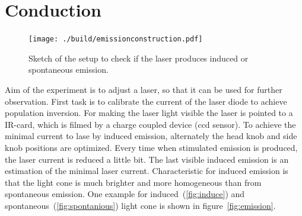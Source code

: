 \section{Conduction}%
\label{sec:conduction}
\begin{figure}
		\centering
		\texttt{[image: ./build/emissionconstruction.pdf]}
		\caption{Sketch of the setup to check if the laser produces induced or
		spontaneous emission. \cite{anleitung}}
		\label{fig:aufbau}
\end{figure}
Aim of the experiment is to adjust a laser, so that it can be used for further
observation.
First task is to calibrate the current of the laser diode to achieve population inversion. 
For making the laser light visible the laser is pointed to a IR-card,
which is filmed by a charge coupled device (ccd sensor).
To achieve the minimal current to lase by induced emission, alternately the head
knob and side knob positions are optimized.
Every time when stimulated emission is produced, the laser current is reduced a
little bit. 
The last visible induced emission is an estimation of the minimal laser current.
Characteristic for induced emission is that the light cone is
much brighter and more homogeneous than from spontaneous emission.
One example for induced~(\ref{fig:induce}) and spontaneous~(\ref{fig:spontanious}) light cone is
shown in figure~\ref{fig:emission}.
